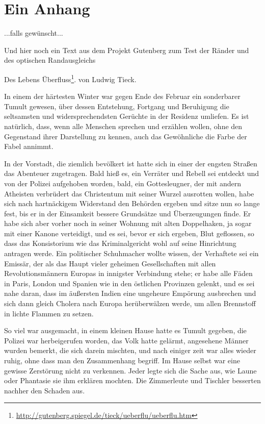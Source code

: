 
\chapter{Ein Anhang}
...falls gewünscht...

Und hier noch ein Text aus dem Projekt Gutenberg zum Test der Ränder und des optischen Randausgleichs

Des Lebens Überfluss\footnote{\url{http://gutenberg.spiegel.de/tieck/ueberflu/ueberflu.htm}}.
von Ludwig Tieck.

In einem der härtesten Winter war gegen Ende des Februar ein sonderbarer Tumult gewesen, über dessen Entstehung, Fortgang und Beruhigung die seltsamsten und widersprechendsten Gerüchte in der Residenz umliefen. Es ist natürlich, dass, wenn alle Menschen sprechen und erzählen wollen, ohne den Gegenstand ihrer Darstellung zu kennen, auch das Gewöhnliche die Farbe der Fabel annimmt.

In der Vorstadt, die ziemlich bevölkert ist hatte sich in einer der engsten Straßen das Abenteuer zugetragen. Bald hieß es, ein Verräter und Rebell sei entdeckt und von der Polizei aufgehoben worden, bald, ein Gottesleugner, der mit andern Atheisten verbrüdert das Christentum mit seiner Wurzel ausrotten wollen, habe sich nach hartnäckigem Widerstand den Behörden ergeben und sitze nun so lange fest, bis er in der Einsamkeit bessere Grundsätze und Überzeugungen finde. Er habe sich aber vorher noch in seiner Wohnung mit alten Doppelhaken, ja sogar mit einer Kanone verteidigt, und es sei, bevor er sich ergeben, Blut geflossen, so dass das Konsistorium wie das Kriminalgericht wohl auf seine Hinrichtung antragen werde. Ein politischer Schuhmacher wollte wissen, der Verhaftete sei ein Emissär, der als das Haupt vieler geheimen Gesellschaften mit allen Revolutionsmännern Europas in innigster Verbindung stehe; er habe alle Fäden in Paris, London und Spanien wie in den östlichen Provinzen gelenkt, und es sei nahe daran, dass im äußersten Indien eine ungeheure Empörung ausbrechen und sich dann gleich Cholera nach Europa herüberwälzen werde, um allen Brennstoff in lichte Flammen zu setzen.

So viel war ausgemacht, in einem kleinen Hause hatte es Tumult gegeben, die Polizei war herbeigerufen worden, das Volk hatte gelärmt, angesehene Männer wurden bemerkt, die sich darein mischten, und nach einiger zeit war alles wieder ruhig, ohne dass man den Zusammenhang begriff. Im Hause selbst war eine gewisse Zerstörung nicht zu verkennen. Jeder legte sich die Sache aus, wie Laune oder Phantasie sie ihm erklären mochten. Die Zimmerleute und Tischler besserten nachher den Schaden aus.


